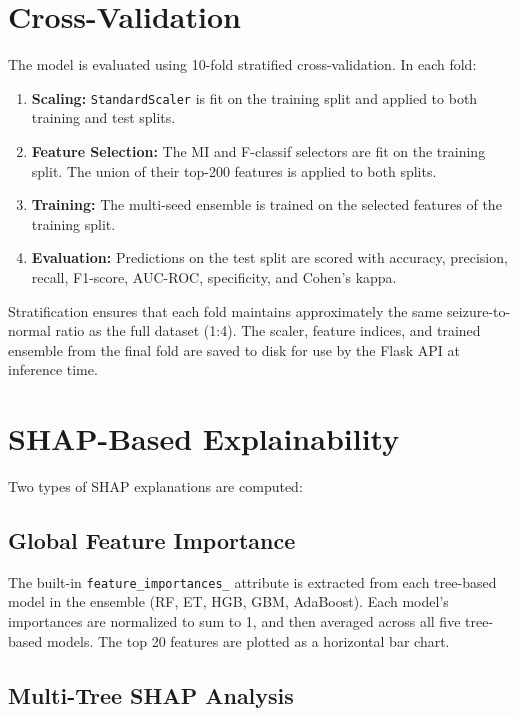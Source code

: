 \section{Cross-Validation}

The model is evaluated using 10-fold stratified cross-validation. In each fold:

\begin{enumerate}
    \item \textbf{Scaling:} \texttt{StandardScaler} is fit on the training split and applied to both training and test splits.
    \item \textbf{Feature Selection:} The MI and F-classif selectors are fit on the training split. The union of their top-200 features is applied to both splits.
    \item \textbf{Training:} The multi-seed ensemble is trained on the selected features of the training split.
    \item \textbf{Evaluation:} Predictions on the test split are scored with accuracy, precision, recall, F1-score, AUC-ROC, specificity, and Cohen's kappa.
\end{enumerate}

Stratification ensures that each fold maintains approximately the same seizure-to-normal ratio as the full dataset (1:4). The scaler, feature indices, and trained ensemble from the final fold are saved to disk for use by the Flask API at inference time.

\section{SHAP-Based Explainability}

Two types of SHAP explanations are computed:

\subsection{Global Feature Importance}

The built-in \texttt{feature\_importances\_} attribute is extracted from each tree-based model in the ensemble (RF, ET, HGB, GBM, AdaBoost). Each model's importances are normalized to sum to 1, and then averaged across all five tree-based models. The top 20 features are plotted as a horizontal bar chart.

\subsection{Multi-Tree SHAP Analysis}

